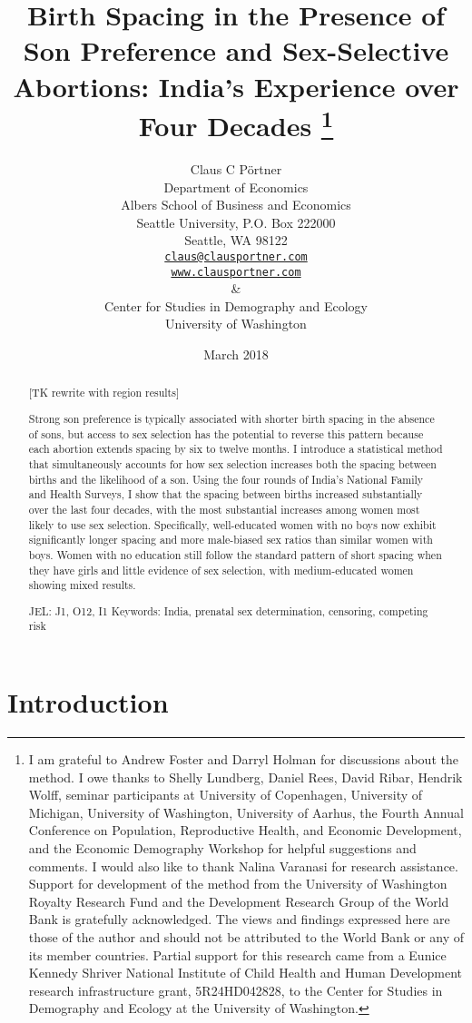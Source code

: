 \documentclass[12pt,letterpaper]{article}
\title{Birth Spacing in the Presence of Son Preference and Sex-Selective Abortions:
India's Experience over Four Decades%
\protect\thanks{%
I am grateful to Andrew Foster and Darryl Holman for discussions about the method.
I owe thanks to Shelly Lundberg, Daniel Rees, David Ribar, 
Hendrik Wolff, seminar participants at University of Copenhagen, University of Michigan, 
University of Washington, University of Aarhus, the Fourth 
Annual Conference on Population, Reproductive Health, 
and Economic Development, and the Economic Demography Workshop for helpful 
suggestions and comments.
I would also like to thank Nalina Varanasi for research assistance.
Support for development of the method from the University of Washington Royalty 
Research Fund and the Development Research Group of the World Bank is gratefully 
acknowledged.
The views and findings expressed here are those of the author and
should not be attributed to the World Bank or any of its member countries.
Partial support for this research came from a Eunice Kennedy Shriver National
Institute of Child Health and Human Development research infrastructure grant,
5R24HD042828, to the Center for Studies in Demography and Ecology at the
University of Washington.
}
}
\author{Claus C P\"ortner\\
    Department of Economics\\
    Albers School of Business and Economics\\
    Seattle University, P.O. Box 222000\\
    Seattle, WA 98122\\
    \href{mailto:claus@clausportner.com}{\texttt{claus@clausportner.com}}\\
    \href{http://www.clausportner.com}{\texttt{www.clausportner.com}}\\
    \& \\
    Center for Studies in Demography and Ecology \\
    University of Washington\\ \vspace{2cm}
    }
\date{March 2018}
\begin{document}
\graphicspath{{../figures/}}

\setcounter{page}{-1}
\maketitle
\thispagestyle{empty}



\newpage
\thispagestyle{empty}
\doublespacing

\begin{abstract}

\noindent 

[TK rewrite with region results]

Strong son preference is typically associated with shorter birth spacing
in the absence of sons, but access to sex selection has the potential to
reverse this pattern because each abortion extends spacing by six to
twelve months. 
I introduce a statistical method that simultaneously accounts for how sex selection 
increases both the spacing between births and the likelihood of a son. 
Using the four rounds of India's National Family and Health Surveys, I show that
the spacing between births increased substantially over the last four
decades, with the most substantial increases among women most 
likely to use sex selection.
Specifically, well-educated women with no boys now
exhibit significantly longer spacing and more male-biased sex ratios
than similar women with boys. 
Women with no education still follow the standard
pattern of short spacing when they have girls and little evidence of sex
selection, with medium-educated women showing mixed results. 



\noindent JEL: J1, O12, I1
\noindent Keywords: India, prenatal sex determination, censoring, competing risk
\end{abstract}

\newpage



\section{Introduction\label{sec:intro}}
\end{document}
